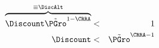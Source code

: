 \begin{eqnarray}
\overbrace{\Discount \tilde{\PGro}^{1-\CRRA} }^{\equiv \DiscAlt} & < & 1 \label{eq:FVR}
\\ \Discount & < & \tilde{\PGro}^{\CRRA-1} \notag
\end{eqnarray}
